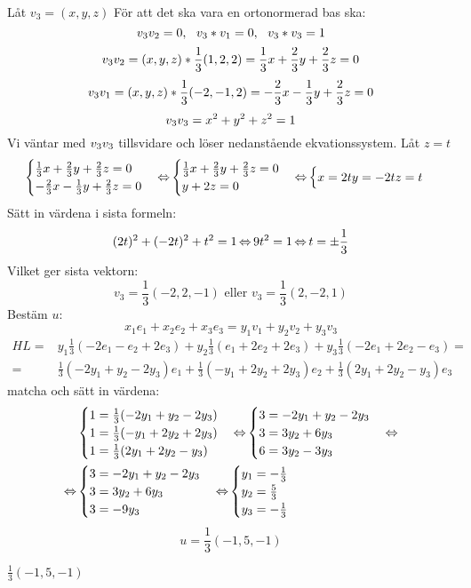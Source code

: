 \pagebreak
\begin{task}{4.16}
	Låt $v_3=(x,y,z)$
	För att det ska vara en ortonormerad bas ska:
	\[v_3\*v_2=0,~~v_3*v_1=0,~~v_3*v_3=1\]
	\[v_3\*v_2=(x,y,z)*\frac{1}{3}(1,2,2)=\frac{1}{3}x+\frac{2}{3}y+\frac{2}{3}z=0\]
	\[v_3\*v_1=(x,y,z)*\frac{1}{3}(-2,-1,2)=-\frac{2}{3}x-\frac{1}{3}y+\frac{2}{3}z=0\]
	\[v_3\*v_3=x^2+y^2+z^2=1\]
	Vi väntar med $v_3\*v_3$ tillsvidare och löser nedanstående ekvationssystem. Låt $z=t$
	\[\begin{cases}
		\frac{1}{3}x+\frac{2}{3}y+\frac{2}{3}z=0 \\
		-\frac{2}{3}x-\frac{1}{3}y+\frac{2}{3}z=0
	\end{cases} \operatorname{\Leftrightarrow}
	\begin{cases}
		\frac{1}{3}x+\frac{2}{3}y+\frac{2}{3}z=0 \\
		y+2z=0
	\end{cases} \operatorname{\Leftrightarrow}
	\begin{cases}
		x=2t
		y=-2t
		z=t
	\end{cases}\]
	Sätt in värdena i sista formeln:
	\[(2t)^2+(-2t)^2+t^2=1 \operatorname{\Leftrightarrow}
	9t^2=1 \operatorname{\Leftrightarrow}
	t=\pm\frac{1}{3}\]
	Vilket ger sista vektorn:
	\[v_3=\frac{1}{3}(-2,2,-1) \text{ eller } v_3=\frac{1}{3}(2,-2,1)\]
	Bestäm $u$:
	\[x_1e_1+x_2e_2+x_3e_3=y_1v_1+y_2v_2+y_3v_3\]
	\begin{align*}
		HL=&y_1\frac{1}{3}(-2e_1-e_2+2e_3)+y_2\frac{1}{3}(e_1+2e_2+2e_3)+y_3\frac{1}{3}(-2e_1+2e_2-e_3)= \\ =
		&\frac{1}{3}(-2y_1+y_2-2y_3)e_1+\frac{1}{3}(-y_1+2y_2+2y_3)e_2+\frac{1}{3}(2y_1+2y_2-y_3)e_3
	\end{align*}
	matcha och sätt in värdena:
	\begin{align*}
		&\begin{cases}
			1=\frac{1}{3}(-2y_1+y_2-2y_3) \\
			1=\frac{1}{3}(-y_1+2y_2+2y_3) \\
			1=\frac{1}{3}(2y_1+2y_2-y_3)
		\end{cases} \operatorname{\Leftrightarrow}
		\begin{cases}
			3=-2y_1+y_2-2y_3 \\
			3=3y_2+6y_3 \\
			6=3y_2-3y_3 
		\end{cases} \operatorname{\Leftrightarrow} \\ \operatorname{\Leftrightarrow}
		&\begin{cases}
			3=-2y_1+y_2-2y_3 \\
			3=3y_2+6y_3 \\
			3=-9y_3 
		\end{cases} \operatorname{\Leftrightarrow}
		\begin{cases}
			y_1=-\frac{1}{3} \\
			y_2=\frac{5}{3} \\
			y_3=-\frac{1}{3}
		\end{cases}
	\end{align*}
	\[u=\frac{1}{3}(-1,5,-1)\]

	\ans $\frac{1}{3}(-1,5,-1)$
\end{task}

